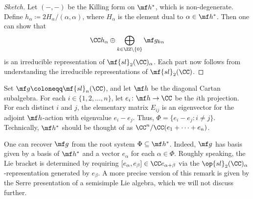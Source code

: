 \documentclass{article}
\begin{document}
\begin{proof}[Sketch]
	Let $(-,-)$ be the Killing form on $\mf h^*$, which is non-degenerate. Define $h_\alpha\coloneqq2H_\alpha/(\alpha,\alpha)$, where $H_\alpha$ is the element dual to $\alpha\in\mf h^*$. Then one can show that
	\[\CC h_\alpha\oplus\bigoplus_{k\in\ZZ\setminus\{0\}}\mf g_{k\alpha}\]
	is an irreducible representation of $\mf{sl}_2(\CC)_\alpha$. Each part now follows from understanding the irreducible representations of $\mf{sl}_2(\CC)$.
\end{proof}
\begin{example}
	Set $\mf g\coloneqq\mf{sl}_n(\CC)$, and let $\mf h$ be the diagonal Cartan subalgebra. For each $i\in\{1,2,\ldots,n\}$, let $e_i\colon\mf h\to\CC$ be the $i$th projection. For each distinct $i$ and $j$, the elementary matrix $E_{ij}$ is an eigenvector for the adjoint $\mf h$-action with eigenvalue $e_i-e_j$. Thus, $\Phi=\{e_i-e_j:i\ne j\}$. Technically, $\mf h^*$ should be thought of as $\CC^n/\CC(e_1+\cdots+e_n)$.
\end{example}
\begin{remark} \label{rem:root-system-to-ss}
	One can recover $\mf g$ from the root system $\Phi\subseteq\mf h^*$. Indeed, $\mf g$ has basis given by a basis of $\mf h^*$ and a vector $e_\alpha$ for each $\alpha\in\Phi$. Roughly speaking, the Lie bracket is determined by requiring $[e_\alpha,e_\beta]\in\CC e_{\alpha+\beta}$ via the $\op{sl}_2(\CC)_\alpha$-representation generated by $e_\beta$. A more precise version of this remark is given by the Serre presentation of a semisimple Lie algebra, which we will not discuss further.
\end{remark}
\end{document}

